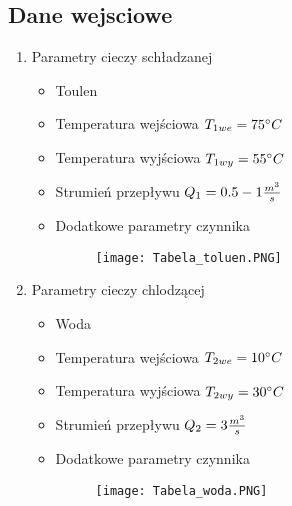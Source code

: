 \subsection{Dane wejsciowe}

    \begin{enumerate}
        \item 
            \begin{flushleft}
                Parametry cieczy schładzanej
                \begin{itemize}
                    \item Toulen
                    \item Temperatura wejściowa \(T_{1we} = 75^\circ C\)
                    \item Temperatura wyjściowa \(T_{1wy} = 55^\circ C\)
                    \item Strumień przepływu    \(Q_{1} = 0.5-1\frac{m^3}{s}\)
                    \item Dodatkowe parametry czynnika    
                        \begin{figure}[h]
                            \centering
                            \texttt{[image: Tabela\_toluen.PNG]}
                        \end{figure}
                \end{itemize}
            \end{flushleft} 
        \pagebreak
        \item 
            \begin{flushleft}
                Parametry cieczy chlodzącej
                \begin{itemize}
                    \item Woda
                    \item Temperatura wejściowa \(T_{2we} = 10^\circ C\)
                    \item Temperatura wyjściowa \(T_{2wy} = 30^\circ C\)
                    \item Strumień przepływu    \(Q_{2} = 3\frac{m^3}{s}\)
                    \item Dodatkowe parametry czynnika
                        \begin{figure}[h]
                            \centering
                            \texttt{[image: Tabela\_woda.PNG]}
                        \end{figure}
                    \end{itemize}
            \end{flushleft}
        \pagebreak    
    \end{enumerate}
    

